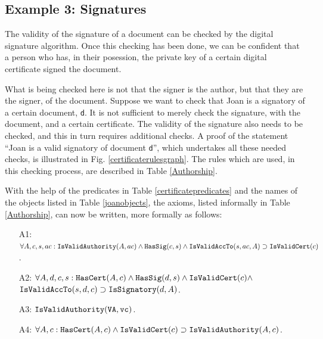\subsection{Example 3: Signatures}\label{exm3}
The validity of the signature of
a document can be checked by the digital signature algorithm.
Once this checking has been done, we can be confident that a person
who has, in their posession, the private key of a certain digital certificate
signed the document. 

What is being checked here is not that the signer is the author, but that they 
are the signer, of the document. Suppose we want to check that Joan is a signatory
of a certain document, {\tt d}. It is not sufficient to merely check the signature,
with the document, and a certain certificate. The validity of the signature also needs
to be checked, and this in turn requires additional checks.
A proof of the statement ``Joan is a valid signatory of document {\tt d}'', which undertakes
all these needed checks, is illustrated in Fig. \ref{certificaterulesgraph}. 
The rules which are used, in this checking process, are described in Table \ref{Authorship}.

With the help of the predicates in Table \ref{certificatepredicates} and the names
of the objects listed in Table \ref{joanobjects}, the 
axioms, listed informally in Table \ref{Authorship}, can now be written, more formally as follows:
\begin{itemize}
		\item[A1:]\label{A1a} 
$\forall A, c, s, ac:\hbox{\tt IsValidAuthority}(A,ac) \wedge \hbox{\tt HasSig}(c,s) \\
	\wedge \hbox{\tt IsValidAccTo}(s,ac,A) \supset \hbox{\tt IsValidCert}(c)$.
	\item[A2:] $\forall A, d, c, s: \hbox{\tt HasCert}(A,c) \wedge \hbox{\tt HasSig}(d,s) \\
	\wedge \hbox{\tt IsValidCert}(c) \wedge$\\
${\tt IsValidAccTo}(s,d,c) \supset \hbox{\tt IsSignatory}(d,A)$.
	\item[A3:] $\hbox{\tt IsValidAuthority}(\hbox{\tt VA},{\tt vc})$.
	\item[A4:] $\forall A, c:\hbox{\tt HasCert}(A,c) \wedge \hbox{\tt IsValidCert}(c) \supset \hbox{\tt IsValidAuthority}(A,c)$.
\end{itemize}

